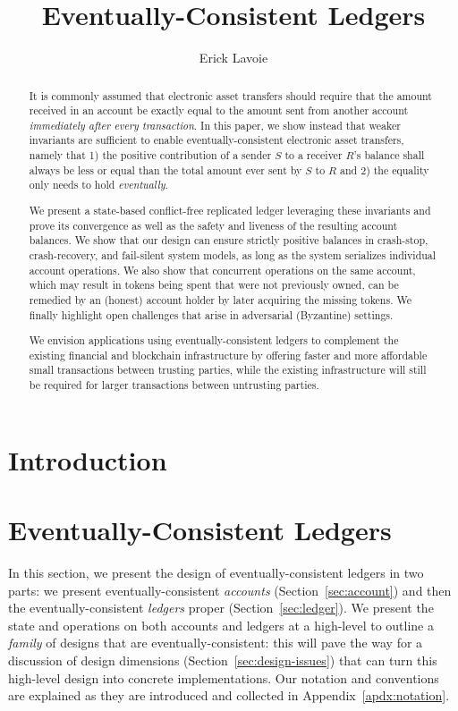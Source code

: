 \documentclass[9pt, oneside]{article}   	%
\title{Eventually-Consistent Ledgers}
\author{Erick Lavoie}
\begin{document}
\maketitle


\begin{abstract}
It is commonly assumed that electronic asset transfers should require that the amount received in an account be exactly equal to the amount sent from another account \textit{immediately after every transaction}.  In this paper, we show instead that weaker invariants are sufficient to enable eventually-consistent electronic asset transfers, namely that 1) the positive contribution of a sender $S$ to a receiver $R$'s balance shall always be less or equal than the total amount ever sent by $S$ to $R$ and 2) the equality only needs to hold \textit{eventually}.

We present a state-based conflict-free replicated ledger leveraging these invariants and prove its convergence as well as the safety and liveness of the resulting account balances. We show that our design can ensure strictly positive balances in crash-stop, crash-recovery, and fail-silent system models, as long as the system serializes individual account operations. We also show that concurrent operations on the same account, which may result in tokens being spent that were not previously owned, can be remedied by an (honest) account holder by later acquiring the missing tokens. We finally highlight open challenges that arise in adversarial (Byzantine) settings. 

We envision applications using eventually-consistent ledgers to complement the existing financial and blockchain infrastructure by offering faster and more affordable small transactions between trusting parties, while the existing infrastructure will still be required for larger transactions between untrusting parties.
\end{abstract}

\section{Introduction}
\label{sec:introduction}

\section{Eventually-Consistent Ledgers}

In this section, we present the design of eventually-consistent ledgers in two parts: we present eventually-consistent \textit{accounts} (Section~\ref{sec:account}) and then the eventually-consistent \textit{ledgers} proper (Section~\ref{sec:ledger}). We present the state and operations on both accounts and ledgers at a high-level to outline a \textit{family} of designs that are eventually-consistent: this will pave the way for a discussion of design dimensions (Section~\ref{sec:design-issues}) that can turn this high-level design into concrete implementations. Our notation and conventions are explained as they are introduced and collected in Appendix~\ref{apdx:notation}.
\end{document}
